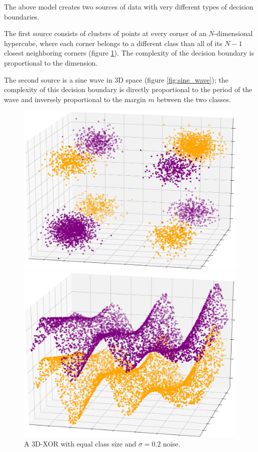 \documentclass{article}
\begin{document}
The above model creates two sources of data with very different types of
decision boundaries.

The first source consists of clusters of points at every
corner of an $N$-dimensional hypercube, where each corner belongs to a
different class than all of its $N-1$ closest neighboring corners (figure
\ref{fig:xor}). The complexity of the decision boundary is proportional to the
dimension.

The second source is a sine wave in 3D space (figure \ref{fig:sine_wave}); the
complexity of this decision boundary is directly proportional to the period of
the wave and inversely proportional to the margin $m$ between the two classes.

\begin{figure}
\begin{minipage}{.5\textwidth}
    \centering
    \includegraphics[width=\textwidth]{xor_3d_square.png}
    \caption{A 3D-XOR with equal class size and $\sigma=0.2$ noise.}
    \label{fig:xor}
\end{minipage}
\begin{minipage}{.5\textwidth}
    \centering
    \includegraphics[width=\textwidth]{sine_wave_square.png}

\end{minipage}
\end{figure}
\end{document}
